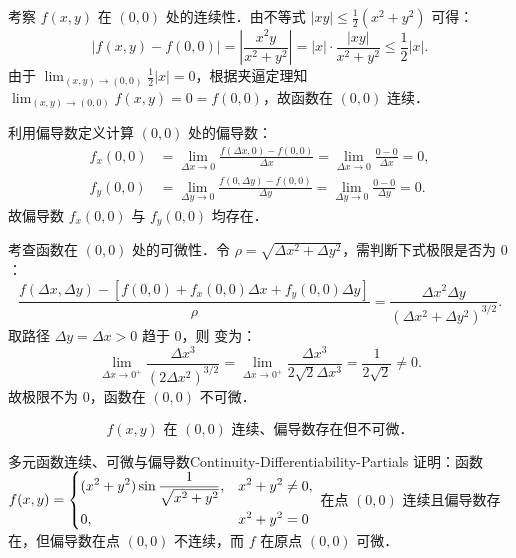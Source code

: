 \begin{myproof}
    考察 $f(x, y)$ 在 $(0, 0)$ 处的连续性．由不等式 $|xy| \le \frac{1}{2}(x^2 + y^2)$ 可得：
    \begin{equation}
        |f(x, y) - f(0, 0)| = \left| \frac{x^2 y}{x^2 + y^2} \right| = |x| \cdot \frac{|xy|}{x^2 + y^2} \le \frac{1}{2} |x|.
    \end{equation}
    由于 $\lim_{(x, y) \to (0, 0)} \frac{1}{2} |x| = 0$，根据夹逼定理知 $\lim_{(x, y) \to (0, 0)} f(x, y) = 0 = f(0, 0)$，故函数在 $(0, 0)$ 连续．

    利用偏导数定义计算 $(0, 0)$ 处的偏导数：
    \begin{equation}
        \begin{aligned}
            f_x(0, 0) & = \lim_{\Delta x \to 0} \frac{f(\Delta x, 0) - f(0, 0)}{\Delta x} = \lim_{\Delta x \to 0} \frac{0 - 0}{\Delta x} = 0, \\
            f_y(0, 0) & = \lim_{\Delta y \to 0} \frac{f(0, \Delta y) - f(0, 0)}{\Delta y} = \lim_{\Delta y \to 0} \frac{0 - 0}{\Delta y} = 0.
        \end{aligned}
    \end{equation}
    故偏导数 $f_x(0, 0)$ 与 $f_y(0, 0)$ 均存在．

    考查函数在 $(0, 0)$ 处的可微性．令 $\rho = \sqrt{\Delta x^2 + \Delta y^2}$，需判断下式极限是否为 $0$：
    \begin{equation}
        \frac{f(\Delta x, \Delta y) - [f(0, 0) + f_x(0, 0)\Delta x + f_y(0, 0)\Delta y]}{\rho} = \frac{\Delta x^2 \Delta y}{(\Delta x^2 + \Delta y^2)^{3/2}}.
        \label{eq:diff-limit}
    \end{equation}
    取路径 $\Delta y = \Delta x > 0$ 趋于 $0$，则  变为：
    \begin{equation}
        \lim_{\Delta x \to 0^+} \frac{\Delta x^3}{(2 \Delta x^2)^{3/2}} = \lim_{\Delta x \to 0^+} \frac{\Delta x^3}{2\sqrt{2} \Delta x^3} = \frac{1}{2\sqrt{2}} \neq 0.
    \end{equation}
    故极限不为 $0$，函数在 $(0, 0)$ 不可微．

    \begin{equation}
        \boxed{f(x, y) \text{ 在 } (0, 0) \text{ 连续、偏导数存在但不可微．}}
    \end{equation}
\end{myproof}


\begin{problem}{多元函数连续、可微与偏导数}{Continuity-Differentiability-Partials}
    证明：函数 $f(x,y) = \begin{dcases} (x^2 + y^2) \sin \frac{1}{\sqrt{x^2+y^2}}, & x^2 + y^2 \neq 0, \\ 0, & x^2 + y^2 = 0 \end{dcases}$ 在点 $(0,0)$ 连续且偏导数存在，但偏导数在点 $(0,0)$ 不连续，而 $f$ 在原点 $(0,0)$ 可微．
\end{problem}


